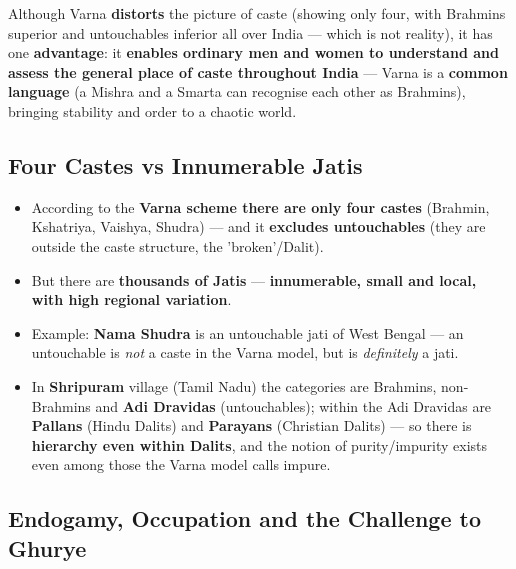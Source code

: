 \begin{KeyConcept}
Although Varna \textbf{distorts} the picture of caste (showing only four, with Brahmins superior and untouchables inferior all over India --- which is not reality), it has one \textbf{advantage}: it \textbf{enables ordinary men and women to understand and assess the general place of caste throughout India} --- Varna is a \textbf{common language} (a Mishra and a Smarta can recognise each other as Brahmins), bringing stability and order to a chaotic world.
\end{KeyConcept}

\subsection{Four Castes vs Innumerable Jatis}

\begin{KeyConcept}
\begin{itemize}
\item According to the \textbf{Varna scheme there are only four castes} (Brahmin, Kshatriya, Vaishya, Shudra) --- and it \textbf{excludes untouchables} (they are outside the caste structure, the 'broken'/Dalit).
\item But there are \textbf{thousands of Jatis} --- \textbf{innumerable, small and local, with high regional variation}.
\item Example: \textbf{Nama Shudra} is an untouchable jati of West Bengal --- an untouchable is \emph{not} a caste in the Varna model, but is \emph{definitely} a jati.
\item In \textbf{Shripuram} village (Tamil Nadu) the categories are Brahmins, non-Brahmins and \textbf{Adi Dravidas} (untouchables); within the Adi Dravidas are \textbf{Pallans} (Hindu Dalits) and \textbf{Parayans} (Christian Dalits) --- so there is \textbf{hierarchy even within Dalits}, and the notion of purity/impurity exists even among those the Varna model calls impure.
\end{itemize}
\end{KeyConcept}

\subsection{Endogamy, Occupation and the Challenge to Ghurye}

